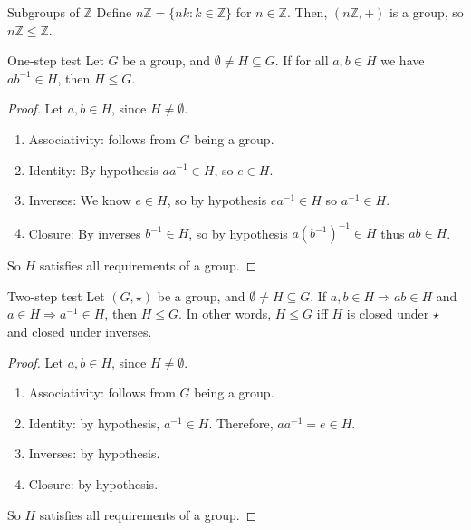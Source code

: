 \documentclass[12pt]{article}
\newcommand{\Z}{\mathbb{Z}}
\newcommand{\inv}{^{-1}}
\begin{document}
	\begin{myex}{Subgroups of $\Z$}{}
		Define $n\Z=\{nk:k\in\Z\}$ for $n\in\Z$. Then, $(n\Z, +)$ is a group, so $n\Z\leq\Z$.
	\end{myex}
	
	\begin{myprop}{One-step test}{}
		Let $G$ be a group, and $\emptyset\neq H\subseteq G$. If for all $a, b\in H$ we have $ab\inv\in H$, then $H\leq G$.
		\begin{proof}
			Let $a, b\in H$, since $H\neq\emptyset$.
			\begin{enumerate}[label=(\roman*)]
				\item Associativity: follows from $G$ being a group.
				\item Identity: By hypothesis $aa\inv\in H$, so $e\in H$.
				\item Inverses: We know $e\in H$, so by hypothesis $ea\inv\in H$ so $a\inv\in H$.
				\item Closure: By inverses $b\inv\in H$, so by hypothesis $a(b\inv)\inv\in H$ thus $ab\in H$.
			\end{enumerate}
			So $H$ satisfies all requirements of a group.
		\end{proof}
	\end{myprop}
	
	\begin{myprop}{Two-step test}{}
		Let $(G, \star)$ be a group, and $\emptyset\neq H\subseteq G$. If $a, b\in H\Longrightarrow ab\in H$ and $a\in H\Longrightarrow a\inv\in H$, then $H\leq G$. In other words, $H\leq G$ iff $H$ is closed under $\star$ and closed under inverses.
		\begin{proof}
			Let $a, b\in H$, since $H\neq\emptyset$.
			\begin{enumerate}[label=(\roman*)]
				\item Associativity: follows from $G$ being a group.
				\item Identity: by hypothesis, $a\inv\in H$. Therefore, $aa\inv=e\in H$.
				\item Inverses: by hypothesis.
				\item Closure: by hypothesis.
			\end{enumerate}
			So $H$ satisfies all requirements of a group.
		\end{proof}
	\end{myprop}
	
\end{document}
